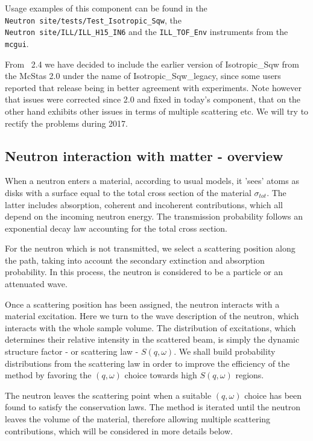 Usage examples of this component can be found in the \\
\verb+Neutron site/tests/Test_Isotropic_Sqw+, the \\
\verb+Neutron site/ILL/ILL_H15_IN6+ and the \verb+ILL_TOF_Env+ instruments from the \verb+mcgui+.

From \MCS\ 2.4 we have decided to include the earlier version of Isotropic\_Sqw from the McStas 2.0 under the name of Isotropic\_Sqw\_legacy, since some users reported that release being in better agreement with experiments. 
Note however that issues were corrected since 2.0 and fixed in today's component, that on the other hand exhibits other issues in terms of multiple scattering etc. We will try to rectify the problems during 2017.

\subsection{Neutron interaction with matter - overview}

When a neutron enters a material, according to usual models, it 'sees' atoms as disks with a surface equal to the total cross section of the material $\sigma_{tot}$. The latter includes absorption, coherent and incoherent contributions, which all depend on the incoming neutron energy.
The transmission probability follows an exponential decay law accounting for the total cross section.

For the neutron which is not transmitted, we select a scattering position along the path, taking into account the secondary extinction and absorption probability. In this process, the neutron is considered to be a particle or an attenuated wave.

Once a scattering position has been assigned, the neutron interacts with a material excitation. Here we turn to the wave description of the neutron, which interacts with the whole sample volume. The distribution of excitations, which determines their relative intensity in the scattered beam, is simply the dynamic structure factor - or scattering law - $S(q,\omega)$. We shall build probability distributions from the scattering law in order to improve the efficiency of the method by favoring the $(q,\omega)$ choice towards high $S(q,\omega)$ regions.

The neutron leaves the scattering point when a suitable $(q, \omega)$ choice has been found to satisfy the conservation laws. The method is iterated until the neutron leaves the volume of the material, therefore allowing multiple scattering contributions, which will be considered in more details below.

